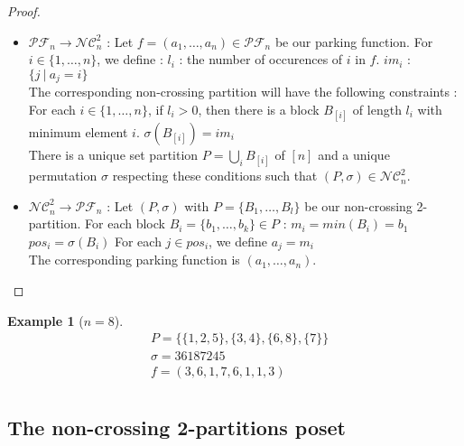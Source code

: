 \documentclass[12pt]{report}
\newtheorem*{example}{Example}
\begin{document}
\begin{proof}
    ~\\
\begin{itemize}
    \item $\mathcal{PF}_n \to \mathcal{NC}^2_n$ :
    Let $f = (a_1, \ldots, a_n) \in \mathcal{PF}_n$
    be our parking function.
    For $i \in \{1, \ldots, n\}$, we define :
        \subitem $l_i$ : the number of occurences of $i$ in $f$. 
        \subitem $im_i$ : $\{j\ |\ a_j = i\}$\\
    The corresponding non-crossing partition will
    have the following constraints :
        \subitem For each $i \in \{1, \ldots, n\}$, if $l_i > 0$,
        then there is a block $B_{[i]}$ of length
        \subitem $l_i$ with minimum element $i$.
        \subitem $\sigma (B_{[i]}) = im_i$\\
    There is a unique set partition
    $\displaystyle P = \bigcup_{i}{B}_{[i]}$ of $[n]$
    and a unique permutation $\sigma$ respecting these
    conditions such that $(P, \sigma) \in \mathcal{NC}^2_n$.
    \item $\mathcal{NC}^2_n \to \mathcal{PF}_n$ :
    Let $(P, \sigma)$ with $P = \{B_1, \ldots, B_l\}$ be our
    non-crossing 2-partition.
    For each block $B_i = \{b_1, \ldots, b_k\} \in P$ :
    \subitem $m_i = min (B_i) = b_1$
    \subitem $pos_i = \sigma (B_i)$
    \subitem For each $j \in pos_i$, we define $a_j = m_i$\\
    The corresponding parking function is $(a_1, \ldots, a_n)$.
\end{itemize}
\end{proof}

\begin{example}[$n = 8$]
    \begin{align*}
        &P = \{\{1, 2, 5\}, \{3, 4\}, \{6, 8\}, \{7\}\}\\
        &\sigma = 36187245\\
        &f = (3, 6, 1, 7, 6, 1, 1, 3)\\
    \end{align*}
\end{example}

\subsection{The non-crossing 2-partitions poset}
\end{document}
